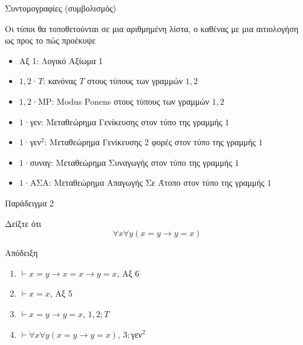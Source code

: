 \documentclass{beamer}
\begin{document}
\begin{frame}{Συντομογραφίες (συμβολισμός)}
  \begin{block}{}
    Οι τύποι θα τοποθετούνται σε μια αριθμημένη λίστα, ο καθένας με μια αιτιολογήση ως προς το πώς προέκυψε
    \begin{itemize}
      \item Αξ 1: Λογικό Αξίωμα 1
      \item $1,2$·$T$: κανόνας $T$ στους τύπους των γραμμών $1,2$
      \item $1,2$·MP: Μodus Ponens στους τύπους των γραμμών $1,2$
      \item $1$·γεν: Μεταθεώρημα Γενίκευσης στον τύπο της γραμμής $1$
      \item $1$·γεν$^2$: Μεταθεώρημα Γενίκευσης 2 φορές στον τύπο της γραμμής $1$
      \item $1$·συναγ: Μεταθεώρημα Συναγωγής στον τύπο της γραμμής $1$
      \item $1$·ΑΣΑ: Μεταθεώρημα Απαγωγής Σε Άτοπο στον τύπο της γραμμής $1$
    \end{itemize}
  \end{block}
\end{frame}

\begin{frame}{Παράδειγμα 2}
  \begin{block}{}
  Δείξτε ότι
    \[
      \forall x \forall y (x = y \rightarrow y = x)
    \]
  \end{block}
  \begin{block}{Απόδειξη}
    \begin{enumerate}
      \item $\vdash x = y \rightarrow x = x \rightarrow y = x$, Αξ 6
      \item $\vdash x = x$, Αξ 5
      \item $\vdash x = y \rightarrow y = x$, $1,2;T$
      \item $\vdash \forall x \forall y (x = y \rightarrow y = x)$, $3;$γεν$^2$
    \end{enumerate}
  \end{block}
\end{frame}
\end{document}
